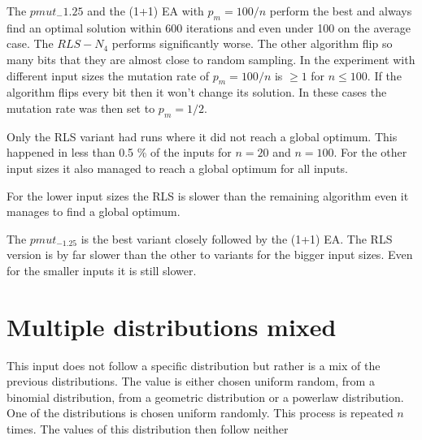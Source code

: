 

The $pmut_-1.25$ and the (1+1) EA with $p_m=100/n$ perform the best and always find an optimal solution within 600 iterations and even under 100 on the average case.
The $RLS-N_4$ performs significantly worse.
The other algorithm flip so many bits that they are almost close to random sampling.
In the experiment with different input sizes the mutation rate of $p_m=100/n$ is $\ge1$ for $n\le100$.
If the algorithm flips every bit then it won't change its solution.
In these cases the mutation rate was then set to $p_m=1/2$.



Only the RLS variant had runs where it did not reach a global optimum.
This happened in less than 0.5 \% of the inputs for $n=20$ and $n=100$.
For the other input sizes it also managed to reach a global optimum for all inputs.



For the lower input sizes the RLS is slower than the remaining algorithm even it manages to find a global optimum.



The $pmut_{-1.25}$ is the best variant closely followed by the (1+1) EA.
The RLS version is by far slower than the other to variants for the bigger input sizes.
Even for the smaller inputs it is still slower.
\section{Multiple distributions mixed}
This input does not follow a specific distribution but rather is a mix of the previous distributions.
The value is either chosen uniform random, from a binomial distribution, from a geometric distribution  or a powerlaw distribution.
One of the distributions is chosen uniform randomly.
This process is repeated $n$ times.
The values of this distribution then follow neither